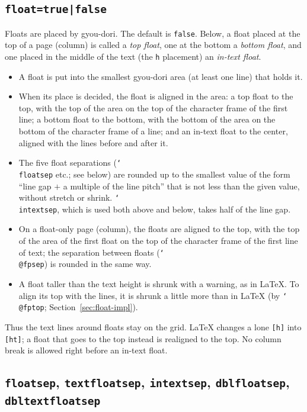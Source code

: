 \documentclass[paper=a4,dvipdfmx]{jlreq}
\newcommand\opt[1]{\texttt{#1}}
\newcommand\cs[1]{\texttt{\char`\\#1}}
\begin{document}
\subsection{\opt{float=true|false}}\label{sec:float}

Floats are placed by gyou-dori. The default is \opt{false}. Below, a float
placed at the top of a page (column) is called a \emph{top float}, one at the
bottom a \emph{bottom float}, and one placed in the middle of the text (the
\opt{h} placement) an \emph{in-text float}.
\begin{itemize}
\item A float is put into the smallest gyou-dori area (at least one line) that
  holds it.
\item When its place is decided, the float is aligned in the area: a top float
  to the top, with the top of the area on the top of the character frame of the
  first line; a bottom float to the bottom, with the bottom of the area on the
  bottom of the character frame of a line; and an in-text float to the center,
  aligned with the lines before and after it.
\item The five float separations (\cs{floatsep} etc.; see below) are rounded up
  to the smallest value of the form ``line gap $+$ a multiple of the line
  pitch'' that is not less than the given value, without stretch or shrink.
  \cs{intextsep}, which is used both above and below, takes half of the line gap.
\item On a float-only page (column), the floats are aligned to the top, with the
  top of the area of the first float on the top of the character frame of the
  first line of text; the separation between floats (\cs{@fpsep}) is rounded
  in the same way.
\item A float taller than the text height is shrunk with a warning, as in
  \LaTeX{}. To align its top with the lines, it is shrunk a little more than
  in \LaTeX{} (by \cs{@fptop}; Section~\ref{sec:float-impl}).
\end{itemize}
Thus the text lines around floats stay on the grid. \LaTeX{} changes a lone
\opt{[h]} into \opt{[ht]}; a float that goes to the top instead is realigned to
the top. No column break is allowed right before an in-text float.

\subsection{\opt{floatsep}, \opt{textfloatsep}, \opt{intextsep},
  \opt{dblfloatsep}, \opt{dbltextfloatsep}}
\end{document}

